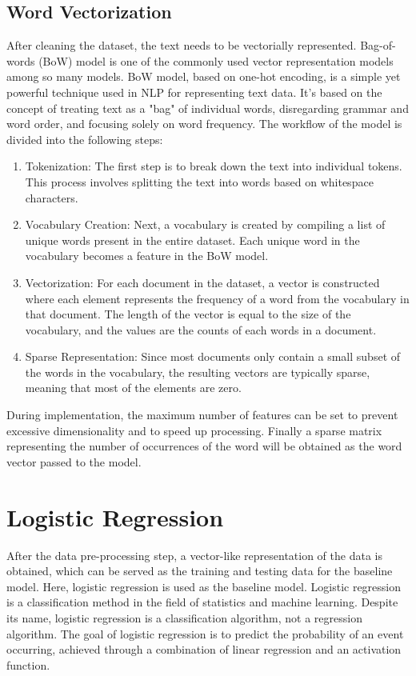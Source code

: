 \documentclass[ %
                    author={Louis Wang},
                supervisor={Dr. Qiang Liu},
                    degree={MSc},
                     title={Identification of Suicide Ideation in Texts},
                      type={},
                      year={2024}]{dissertation}
\begin{document}
\subsection{Word Vectorization}
\noindent
After cleaning the dataset, the text needs to be vectorially represented. Bag-of-words (BoW) model is one of the commonly used vector representation models among so many models. BoW model, based on one-hot encoding\cite{chren1998one}, is a simple yet powerful technique used in NLP for representing text data. It's based on the concept of treating text as a "bag" of individual words, disregarding grammar and word order, and focusing solely on word frequency. The workflow of the model is divided into the following steps:

\begin{enumerate}
      \item Tokenization: The first step is to break down the text into individual tokens. This process involves splitting the text into words based on whitespace characters.
      \item Vocabulary Creation: Next, a vocabulary is created by compiling a list of unique words present in the entire dataset. Each unique word in the vocabulary becomes a feature in the BoW model.
      \item Vectorization: For each document in the dataset, a vector is constructed where each element represents the frequency of a word from the vocabulary in that document. The length of the vector is equal to the size of the vocabulary, and the values are the counts of each words in a document.
      \item Sparse Representation: Since most documents only contain a small subset of the words in the vocabulary, the resulting vectors are typically sparse, meaning that most of the elements are zero.
\end{enumerate}

During implementation, the maximum number of features can be set to prevent excessive dimensionality and to speed up processing. Finally a sparse matrix representing the number of occurrences of the word will be obtained as the word vector passed to the model.

\section{Logistic Regression}
\noindent
After the data pre-processing step, a vector-like representation of the data is obtained, which can be served as the training and testing data for the baseline model. Here, logistic regression is used as the baseline model. Logistic regression is a classification method in the field of statistics and machine learning. Despite its name, logistic regression is a classification algorithm, not a regression algorithm. The goal of logistic regression is to predict the probability of an event occurring, achieved through a combination of linear regression and an activation function.
\end{document}
